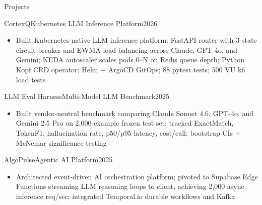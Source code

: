 \documentclass{mcdowellcv}
\begin{document}
\begin{cvsection}{Projects}

  \begin{cvsubsection}{CortexQ}{Kubernetes LLM Inference Platform}{2026}
    \begin{itemize}
      \item Built Kubernetes-native LLM inference platform: FastAPI router with 3-state circuit breaker and EWMA load balancing across Claude, GPT-4o, and Gemini; KEDA autoscaler scales pods 0--N on Redis queue depth; Python Kopf CRD operator; Helm + ArgoCD GitOps; 88 pytest tests; 500 VU k6 load tests
    \end{itemize}
  \end{cvsubsection}

  \begin{cvsubsection}{LLM Eval Harness}{Multi-Model LLM Benchmark}{2025}
    \begin{itemize}
      \item Built vendor-neutral benchmark comparing Claude Sonnet 4.6, GPT-4o, and Gemini 2.5 Pro on 2,000-example frozen test set; tracked ExactMatch, TokenF1, hallucination rate, p50/p95 latency, cost/call; bootstrap CIs + McNemar significance testing
    \end{itemize}
  \end{cvsubsection}

  \begin{cvsubsection}{AlgoPulse}{Agentic AI Platform}{2025}
    \begin{itemize}
      \item Architected event-driven AI orchestration platform; pivoted to Supabase Edge Functions streaming LLM reasoning loops to client, achieving 2,000 async inference req/sec; integrated Temporal.io durable workflows and Kafka
    \end{itemize}
  \end{cvsubsection}

\end{cvsection}
\end{document}
